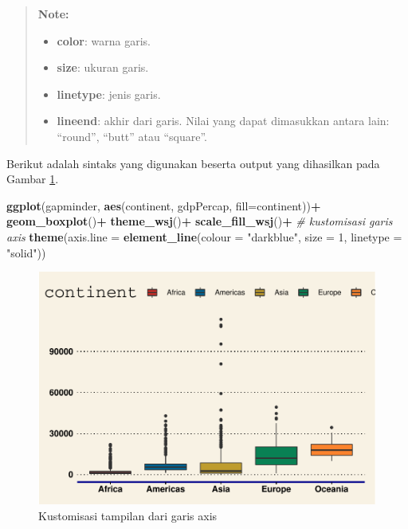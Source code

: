 \documentclass[]{book}
\newenvironment{Shaded}{\begin{snugshade}}{\end{snugshade}}
\newcommand{\KeywordTok}[1]{\textcolor[rgb]{0.13,0.29,0.53}{\textbf{#1}}}
\newcommand{\DataTypeTok}[1]{\textcolor[rgb]{0.13,0.29,0.53}{#1}}
\newcommand{\DecValTok}[1]{\textcolor[rgb]{0.00,0.00,0.81}{#1}}
\newcommand{\StringTok}[1]{\textcolor[rgb]{0.31,0.60,0.02}{#1}}
\newcommand{\CommentTok}[1]{\textcolor[rgb]{0.56,0.35,0.01}{\textit{#1}}}
\newcommand{\OperatorTok}[1]{\textcolor[rgb]{0.81,0.36,0.00}{\textbf{#1}}}
\newcommand{\NormalTok}[1]{#1}
\providecommand{\tightlist}{%
  \setlength{\itemsep}{0pt}\setlength{\parskip}{0pt}}
\begin{document}
\begin{quote}
\textbf{Note: }

\begin{itemize}
\tightlist
\item
  \textbf{color}: warna garis.
\item
  \textbf{size}: ukuran garis.
\item
  \textbf{linetype}: jenis garis.
\item
  \textbf{lineend}: akhir dari garis. Nilai yang dapat dimasukkan antara
  lain: ``round'', ``butt'' atau ``square''.
\end{itemize}
\end{quote}

Berikut adalah sintaks yang digunakan beserta output yang dihasilkan
pada Gambar \ref{fig:ggtick3}.

\begin{Shaded}
\begin{Highlighting}[]
\KeywordTok{ggplot}\NormalTok{(gapminder, }\KeywordTok{aes}\NormalTok{(continent, gdpPercap,}
                      \DataTypeTok{fill=}\NormalTok{continent))}\OperatorTok{+}
\StringTok{  }\KeywordTok{geom_boxplot}\NormalTok{()}\OperatorTok{+}
\StringTok{  }\KeywordTok{theme_wsj}\NormalTok{()}\OperatorTok{+}
\StringTok{  }\KeywordTok{scale_fill_wsj}\NormalTok{()}\OperatorTok{+}
\StringTok{  }\CommentTok{# kustomisasi garis axis}
\StringTok{  }\KeywordTok{theme}\NormalTok{(}\DataTypeTok{axis.line =} \KeywordTok{element_line}\NormalTok{(}\DataTypeTok{colour =} \StringTok{"darkblue"}\NormalTok{, }
                      \DataTypeTok{size =} \DecValTok{1}\NormalTok{, }\DataTypeTok{linetype =} \StringTok{"solid"}\NormalTok{))}
\end{Highlighting}
\end{Shaded}

\begin{figure}

{\centering \includegraphics[width=0.7\linewidth]{EnvStat_files/figure-latex/ggtick3-1} 

}

\caption{Kustomisasi tampilan dari garis axis}\label{fig:ggtick3}
\end{figure}
\end{document}
